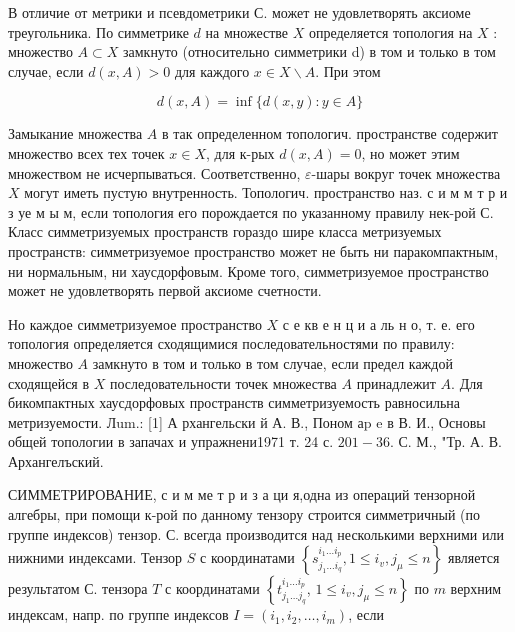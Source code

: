 \documentclass[10pt]{article}
\begin{document}
В отличие от метрики и псевдометрики С. может не удовлетворять аксиоме треугольника. По симметрике $d$ на множестве $X$ определяется топология на $X$ : множество $A \subset X$ замкнуто (относительно симметрики d) в том и только в том случае, если $d(x, A)>0$ для каждого $x \in X \backslash A$. При этом



\[

d(x, A)=\inf \{d(x, y): y \in A\}

\]



Замыкание множества $A$ в так определенном топологич. пространстве содержит множество всех тех точек $x \in X$, для к-рых $d(x, A)=0$, но может этим множеством не исчерпываться. Соответственно, $\varepsilon$-шары вокруг точек множества $X$ могут иметь пустую внутренность. Топологич. пространство наз. с и м м т р и з уе м ы м, если топология его порождается по указанному правилу нек-рой С. Класс симметризуемых пространств гораздо шире класса метризуемых пространств: симметризуемое пространство может не быть ни паракомпактным, ни нормальным, ни хаусдорфовым. Кроме того, симметризуемое пространство может не удовлетворять первой аксиоме счетности.



Но каждое симметризуемое пространство $X$ с е кв е н ц и а ль н о, т. е. его топология определяется сходящимися последовательностями по правилу: множество $A$ замкнуто в том и только в том случае, если предел каждой сходящейся в $X$ последовательности точек множества $A$ принадлежит $A$. Для бикомпактных хаусдорфовых пространств симметризуемость равносильна метризуемости. Лum.: [1] А рхангельски й А. В., Поном аp e в В. И., Основы общей топологии в запачах и упражнени1971 т. 24 с. $201-36$. С. М., "Тр. А. В. Архангелъский.



СИММЕТРИРОВАНИЕ, с и м ме т р и з а ци я,одна из операций тензорной алгебры, при помощи к-рой по данному тензору строится симметричный (по группе индексов) тензор. С. всегда производится над несколькими верхними или нижними индексами. Тензор $S$ с координатами $\left\{s_{j_{1} \ldots i_{q}}^{i_{1} \ldots i_{p}}, 1 \leqslant i_{v}, j_{\mu} \leqslant n\right\}$ является результатом С. тензора $T$ с координатами $\left\{t_{j_{1} \ldots j_{q}}^{i_{1} \ldots i_{p}}\right.$, $\left.1 \leqslant i_{v}, j_{\mu} \leqslant n\right\}$ по $m$ верхним индексам, напр. по группе индексов $I=\left(i_{1}, i_{2}, \ldots, i_{m}\right)$, если
\end{document}

